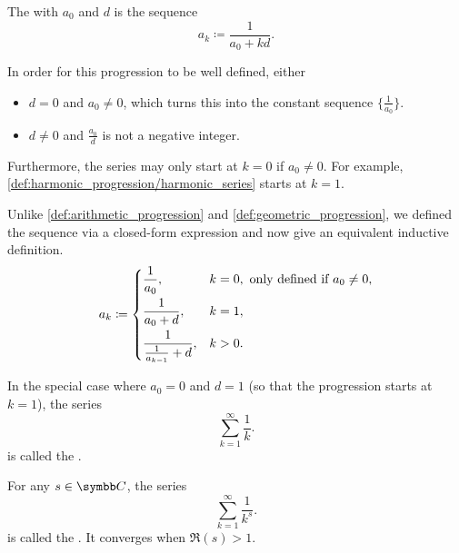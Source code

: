 \begin{definition}\label{def:harmonic_progression}
  The  with  \( a_0 \) and  \( d \) is the sequence
  \begin{equation*}
    a_k \coloneqq \frac 1 {a_0 + kd}.
  \end{equation*}

  \begin{defenum}
     In order for this progression to be well defined, either
    \begin{itemize}
      \item \( d = 0 \) and \( a_0 \neq 0 \), which turns this into the constant sequence \( \{ \tfrac 1 {a_0} \} \).

      \item \( d \neq 0 \) and \( \frac {a_0} d \) is not a negative integer.
    \end{itemize}

    Furthermore, the series may only start at \( k = 0 \) if \( a_0 \neq 0 \). For example, \cref{def:harmonic_progression/harmonic_series} starts at \( k = 1 \).

     Unlike \cref{def:arithmetic_progression} and \cref{def:geometric_progression}, we defined the sequence via a closed-form expression and now give an equivalent inductive definition. \begin{equation*}
      a_k \coloneqq \begin{dcases}
        \frac 1 {a_0}, &k = 0, \text{ only defined if } a_0 \neq 0, \\
        \frac 1 {a_0 + d}, &k = 1, \\
        \frac 1 {\frac 1 {a_{k-1}} + d}, &k > 0.
      \end{dcases}
    \end{equation*}

     In the special case where \( a_0 = 0 \) and \( d = 1 \) (so that the progression starts at \( k = 1 \)), the series
    \begin{equation}\label{def:harmonic_progression/harmonic_series}
      \sum_{k=1}^\infty \frac 1 k.
    \end{equation}
    is called the .

     For any \( s \in \C \), the series
    \begin{equation*}
      \sum_{k=1}^\infty \frac 1 {k^s}.
    \end{equation*}
    is called the . It converges when \( \Re(s) > 1 \).
  \end{defenum}
\end{definition}
